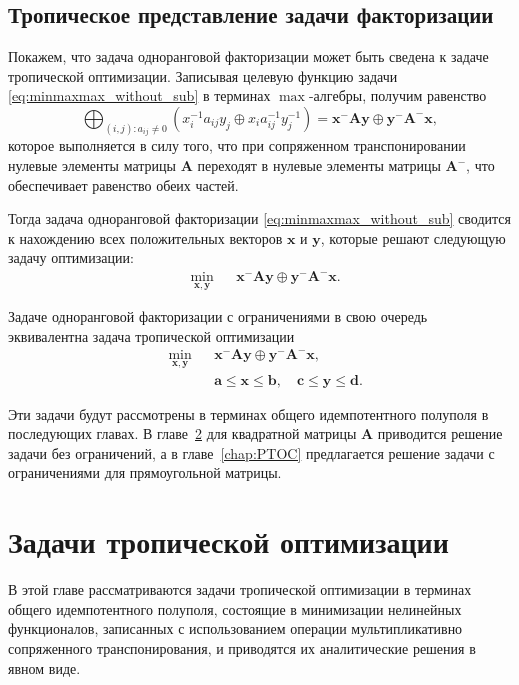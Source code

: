 \documentclass[specialist,
               substylefile = spbu.rtx,
               subf,href,colorlinks=true, 12pt]{disser}
\theoremstyle{definition}
\begin{document}
\section{Тропическое представление задачи факторизации}\label{sec:TRFP}
Покажем, что задача одноранговой факторизации может быть сведена к задаче тропической оптимизации. 
Записывая целевую функцию задачи \eqref{eq:minmaxmax_without_sub} в терминах $\max$-алгебры, получим равенство
\begin{equation*}
\bigoplus_{(i,j):a_{ij}\neq 0}(x_{i}^{-1}a_{ij}y_{j}\oplus x_{i}a_{ij}^{-1}y_{j}^{-1})
=
\bm{x}^{-}\bm{A}\bm{y}
\oplus
\bm{y}^{-}\bm{A}^{-}\bm{x},
\end{equation*}
которое выполняется в силу того, что при сопряженном транспонировании нулевые элементы матрицы $\bm{A}$ переходят в нулевые элементы матрицы $\bm{A}^{-}$, что обеспечивает равенство обеих частей.

Тогда задача одноранговой факторизации \eqref{eq:minmaxmax_without_sub} сводится к нахождению всех положительных векторов $\bm{x}$ и $\bm{y}$, которые решают следующую задачу оптимизации:
\begin{equation*}%
\begin{aligned}
&
\min_{\bm{x},\bm{y}}
&&
\bm{x}^{-}\bm{A}\bm{y}
\oplus
\bm{y}^{-}\bm{A}^{-}\bm{x}.
\end{aligned}
\end{equation*}

Задаче одноранговой факторизации с ограничениями в свою очередь эквивалентна задача тропической оптимизации
\begin{equation*}%
\begin{aligned}
&
\min_{\bm{x},\bm{y}}
&&
\bm{x}^{-}\bm{A}\bm{y}
\oplus
\bm{y}^{-}\bm{A}^{-}\bm{x},\\
& &&\bm{a}\leq\bm{x}\leq\bm{b},
\quad
\bm{c}\leq\bm{y}\leq\bm{d}.
\end{aligned}
\end{equation*}

Эти задачи будут рассмотрены в терминах общего идемпотентного полуполя в последующих главах. В главе~\ref{chap:PTO} для квадратной матрицы $\bm{A}$ приводится решение задачи без ограничений, а в главе~\ref{chap:PTOC} предлагается решение задачи с ограничениями для прямоугольной матрицы.


\chapter{Задачи тропической оптимизации}\label{chap:PTO}
В этой главе рассматриваются задачи тропической оптимизации в терминах
общего идемпотентного полуполя, состоящие в минимизации нелинейных функционалов, записанных с использованием операции мультипликативно сопряженного транспонирования, и приводятся их аналитические решения в явном виде. 
\end{document}
